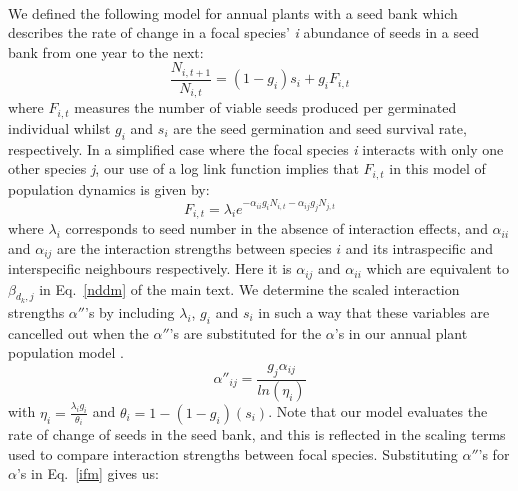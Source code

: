 \begin{refsection}
        \paragraph{} 
        We defined the following model for annual plants with a seed bank \parencite{Levine2009, Mayfield2017, Bimler2018} which describes the rate of change in a focal species' \textit{i} abundance of seeds in a seed bank from one year to the next: 
            \begin{equation}
                \frac{N_{i, t+1}}{N_{i, t}} = \left( 1 - g_{i} \right) s_{i} + g_{i}F_{i, t}
                \label{ifm}
            \end{equation}
        where \(F_{i,t}\) measures the number of viable seeds produced per germinated individual whilst \(g_{i}\) and \(s_{i}\) are the seed germination and seed survival rate, respectively. In a simplified case where the focal species \textit{i} interacts with only one other species \textit{j}, our use of a log link function implies that \(F_{i,t}\) in this model of population dynamics is given by:
            \begin{equation}
                F_{i,t} = \lambda_{i} e^{- \alpha_{ii} g_{i} N_{i, t} -  \alpha_{ij} g_{j} N_{j, t} }
                \label{fecundity}   
            \end{equation}
        where \(\lambda_{i}\) corresponds to seed number in the absence of interaction effects, and \(\alpha_{ii}\) and \(\alpha_{ij}\) are the interaction strengths between species \(i\) and its intraspecific and interspecific neighbours respectively. Here it is \(\alpha_{ij}\) and \(\alpha_{ii}\) which are equivalent to \(\beta_{d_k, j}\) in Eq.~\ref{nddm} of the main text. 
        We determine the scaled interaction strengths ${\alpha}''$'s by including \(\lambda_{i}\), \(g_{i}\) and \(s_{i}\) in such a way that these variables are cancelled out when the ${\alpha}''$'s are substituted for the $\alpha$'s in our annual plant population model \parencite{Godoy2014, Bimler2018}. 
        \begin{equation}
            {\alpha}''_{ij} = \frac{g_{j} \alpha_{ij}}{ln(\eta_{i})}
        \end{equation}
        with $\eta_{i} = \frac{\lambda_{i} g_{i}}{\theta_{i}}$ and $\theta_{i} = 1 - (1 - g_{i})(s_{i})$. %
        Note that our model evaluates the rate of change of seeds in the seed bank, and this is reflected in the scaling terms used to compare interaction strengths between focal species. Substituting ${\alpha}''$'s for $\alpha$'s in Eq.~\ref{ifm} gives us: 
    

\end{refsection}
